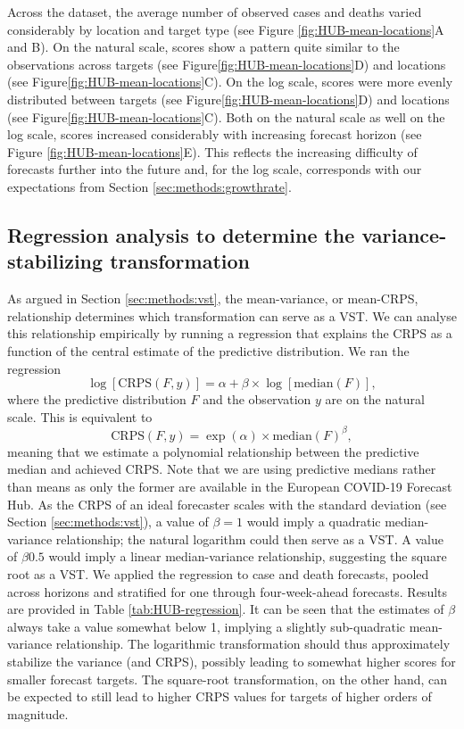 \documentclass{article}
\begin{document}
Across the dataset, the average number of observed cases and deaths varied considerably by location and target type (see Figure \ref{fig:HUB-mean-locations}A and B). On the natural scale, scores show a pattern quite similar to the observations across targets (see Figure\ref{fig:HUB-mean-locations}D) and locations (see Figure\ref{fig:HUB-mean-locations}C). On the log scale, scores were more evenly distributed between targets (see Figure\ref{fig:HUB-mean-locations}D) and locations (see Figure\ref{fig:HUB-mean-locations}C). Both on the natural scale as well on the log scale, scores increased considerably with increasing forecast horizon (see Figure \ref{fig:HUB-mean-locations}E). This reflects the increasing difficulty of forecasts further into the future and, for the log scale, corresponds with our expectations from Section \ref{sec:methods:growthrate}. 





\subsection{Regression analysis to determine the variance-stabilizing transformation}
\label{sec:HUB-regression}

As argued in Section \ref{sec:methods:vst}, the mean-variance, or mean-CRPS, relationship determines which transformation can serve as a VST. We can analyse this relationship empirically by running a regression that explains the CRPS as a function of the central estimate of the predictive distribution. We ran the regression
\begin{equation*}
    \log[\text{CRPS}(F, y)] = \alpha + \beta \times \log[\text{median}(F)], 
\end{equation*}
where the predictive distribution $F$ and the observation $y$ are on the natural scale. This is equivalent to
\begin{equation*}
    \text{CRPS}(F, y) = \exp(\alpha) \times \text{median}(F)^\beta, 
\end{equation*}
meaning that we estimate a polynomial relationship between the predictive median and achieved CRPS. Note that we are using predictive medians rather than means as only the former are available in the European COVID-19 Forecast Hub. As the CRPS of an ideal forecaster scales with the standard deviation (see Section \ref{sec:methods:vst}), a value of $\beta = 1$ would imply a quadratic median-variance relationship; the natural logarithm could then serve as a VST. A value of $\beta 0.5$ would imply a linear median-variance relationship, suggesting the square root as a VST. We applied the regression to case and death forecasts, pooled across horizons and stratified for one through four-week-ahead forecasts. Results are provided in Table \ref{tab:HUB-regression}. It can be seen that the estimates of $\beta$ always take a value somewhat below 1, implying a slightly sub-quadratic mean-variance relationship. The logarithmic transformation should thus approximately stabilize the variance (and CRPS), possibly leading to somewhat higher scores for smaller forecast targets. The square-root transformation, on the other hand, can be expected to still lead to higher CRPS values for targets of higher orders of magnitude.
\end{document}
